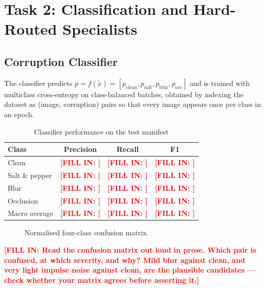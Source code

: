 \documentclass[conference]{IEEEtran}
\newcommand{\PLACEHOLDER}[1]{\textcolor{red}{\textbf{[FILL IN: #1]}}}
\begin{document}
\section{Task 2: Classification and Hard-Routed Specialists}
\subsection{Corruption Classifier}
The classifier predicts $p = f(\tilde{x}) = [p_{\text{clean}}, p_{\text{salt}},
p_{\text{blur}}, p_{\text{occ}}]$ and is trained with multiclass cross-entropy
on class-balanced batches, obtained by indexing the dataset as (image,
corruption) pairs so that every image appears once per class in an epoch.

\begin{table}[t]
\caption{Classifier performance on the test manifest}
\label{tab:task2cls}
\centering
\begin{tabular}{@{}lccc@{}}
\toprule
\textbf{Class} & \textbf{Precision} & \textbf{Recall} & \textbf{F1} \\
\midrule
Clean & \PLACEHOLDER{} & \PLACEHOLDER{} & \PLACEHOLDER{} \\
Salt \& pepper & \PLACEHOLDER{} & \PLACEHOLDER{} & \PLACEHOLDER{} \\
Blur & \PLACEHOLDER{} & \PLACEHOLDER{} & \PLACEHOLDER{} \\
Occlusion & \PLACEHOLDER{} & \PLACEHOLDER{} & \PLACEHOLDER{} \\
\midrule
Macro average & \PLACEHOLDER{} & \PLACEHOLDER{} & \PLACEHOLDER{} \\
\bottomrule
\end{tabular}
\end{table}

\begin{figure}[t]
\centering
\caption{Normalised four-class confusion matrix.}
\label{fig:task2cm}
\end{figure}

\PLACEHOLDER{Read the confusion matrix out loud in prose. Which pair is
confused, at which severity, and why? Mild blur against clean, and very light
impulse noise against clean, are the plausible candidates --- check whether your
matrix agrees before asserting it.}
\end{document}
